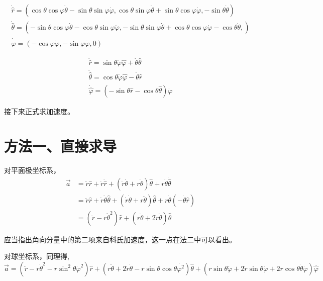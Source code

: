 \documentclass{ctexart}
\begin{document}
    \begin{gather*}
        \dot{\hat{r}} = (\cos\theta\cos\varphi\dot{\theta}-\sin\theta\sin\varphi\dot{\varphi},
        \cos\theta\sin\varphi\dot{\theta}+\sin\theta\cos\varphi\dot{\varphi},
        -\sin\theta\dot{\theta}) \\
        \dot{\hat{\theta}} = (-\sin\theta\cos\varphi\dot{\theta}-\cos\theta\sin\varphi\dot{\varphi},
        -\sin\theta\sin\varphi\dot{\theta}+\cos\theta\cos\varphi\dot{\varphi}
        -\cos\theta\dot{\theta},) \\
        \dot{\hat{\varphi}} = (-\cos\varphi\dot{\varphi},-\sin\varphi\dot{\varphi},0)
    \end{gather*}

    \begin{gather*}
        \dot{\hat{r}} = \sin\theta\dot{\varphi}\hat{\varphi}+\dot{\theta}\hat{\theta} \\
        \dot{\hat{\theta}} = \cos\theta\dot{\varphi}\hat{\varphi}-\dot{\theta}\hat{r} \\
        \dot{\hat{\varphi}} = (-\sin\theta\hat{r}-\cos\theta\hat{\theta})\dot{\varphi}
    \end{gather*}

    接下来正式求加速度。

    \section{方法一、直接求导}\label{sec:2}

    对平面极坐标系，
    \begin{align*}
        \vec{a} &= \ddot{r}\hat{r}+\dot{r}\dot{\hat{r}}+(\dot{r}\dot{\theta}+r\ddot{\theta})\hat{\theta}
        +r\dot{\theta}\dot{\hat{\theta}} \\
        &= \ddot{r}\hat{r}+\dot{r}\dot{\theta}\hat{\theta}+(\dot{r}\dot{\theta}+r\ddot{\theta})
        \hat{\theta}+r\dot{\theta}(-\dot{\theta}\hat{r}) \\
        &= (\ddot{r}-r\dot{\theta}^2)\hat{r}+(r\ddot{\theta}+2\dot{r}\dot{\theta})\hat{\theta}
    \end{align*}

    应当指出角向分量中的第二项来自科氏加速度，这一点在法二中可以看出。

    对球坐标系，同理得,
    \begin{equation*}
        \vec{a} = (\ddot{r}-r\dot{\theta}^2-r\sin^2\theta\dot{\varphi}^2)\hat{r}+
        (r\ddot{\theta}+2\dot{r}\dot{\theta}-r\sin\theta\cos\theta\dot{\varphi^2})\hat{\theta}+
        (r\sin\theta\ddot{\varphi}+2\dot{r}\sin\theta\dot{\varphi}+
        2r\cos\theta\dot{\theta}\dot{\varphi})\hat{\varphi}
    \end{equation*}
\end{document}
